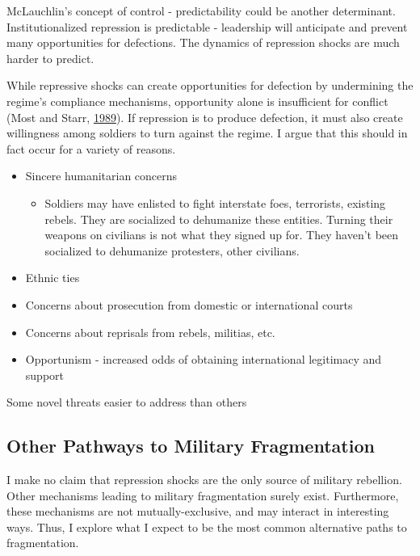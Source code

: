 \documentclass[
  12pt,
]{article}
\providecommand{\tightlist}{%
  \setlength{\itemsep}{0pt}\setlength{\parskip}{0pt}}
\begin{document}
McLauchlin's concept of control - predictability could be another determinant. Institutionalized repression is predictable - leadership will anticipate and prevent many opportunities for defections. The dynamics of repression shocks are much harder to predict.

While repressive shocks can create opportunities for defection by undermining the regime's compliance mechanisms, opportunity alone is insufficient for conflict (Most and Starr, \protect\hyperlink{ref-Most1989}{1989}). If repression is to produce defection, it must also create willingness among soldiers to turn against the regime. I argue that this should in fact occur for a variety of reasons.

\begin{itemize}
\tightlist
\item
  Sincere humanitarian concerns

  \begin{itemize}
  \tightlist
  \item
    Soldiers may have enlisted to fight interstate foes, terrorists, existing rebels. They are socialized to dehumanize these entities. Turning their weapons on civilians is not what they signed up for. They haven't been socialized to dehumanize protesters, other civilians.
  \end{itemize}
\item
  Ethnic ties
\item
  Concerns about prosecution from domestic or international courts
\item
  Concerns about reprisals from rebels, militias, etc.
\item
  Opportunism - increased odds of obtaining international legitimacy and support
\end{itemize}

Some novel threats easier to address than others

\hypertarget{other-pathways-to-military-fragmentation}{%
\subsection{Other Pathways to Military Fragmentation}\label{other-pathways-to-military-fragmentation}}

I make no claim that repression shocks are the only source of military rebellion. Other mechanisms leading to military fragmentation surely exist. Furthermore, these mechanisms are not mutually-exclusive, and may interact in interesting ways. Thus, I explore what I expect to be the most common alternative paths to fragmentation.
\end{document}
